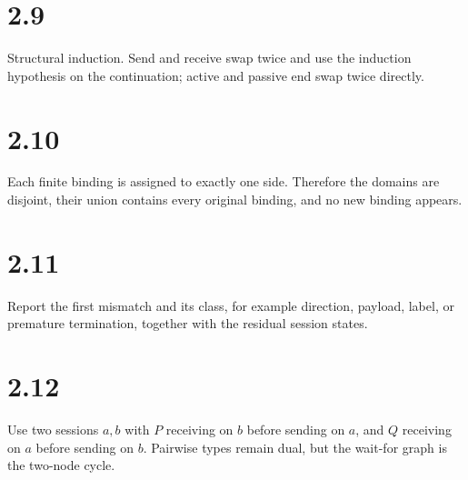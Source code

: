 \section*{2.9}
Structural induction. Send and receive swap twice and use the induction hypothesis on the continuation; active and passive end swap twice directly.

\section*{2.10}
Each finite binding is assigned to exactly one side. Therefore the domains are disjoint, their union contains every original binding, and no new binding appears.

\section*{2.11}
Report the first mismatch and its class, for example direction, payload, label, or premature termination, together with the residual session states.

\section*{2.12}
Use two sessions $a,b$ with $P$ receiving on $b$ before sending on $a$, and $Q$ receiving on $a$ before sending on $b$. Pairwise types remain dual, but the wait-for graph is the two-node cycle.
